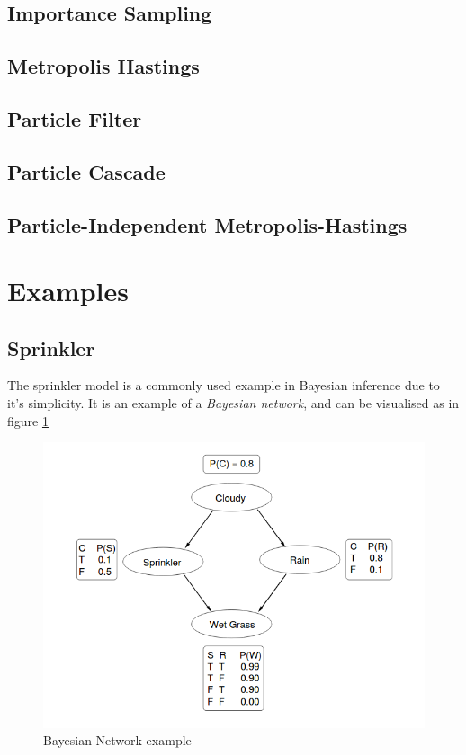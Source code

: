 \subsection{Importance Sampling} \label{sec:imp}
\subsection{Metropolis Hastings} \label{sec:mh}
\subsection{Particle Filter} \label{sec:pf}
\subsection{Particle Cascade} \label{sec:pc}
\subsection{Particle-Independent Metropolis-Hastings} \label{sec:pimh}

\section{Examples}

\subsection{Sprinkler}
The sprinkler model is a commonly used example in Bayesian inference due to it's simplicity. It is an example of a \textit{Bayesian network}, and can be visualised as in figure \ref{fig:sprinkler-network}

\begin{figure}[!htb]
    \centering
    \includegraphics[width=\textwidth]{figs/sprinkler-network.png}
    \caption{Bayesian Network example}
    \label{fig:sprinkler-network}
\end{figure}

